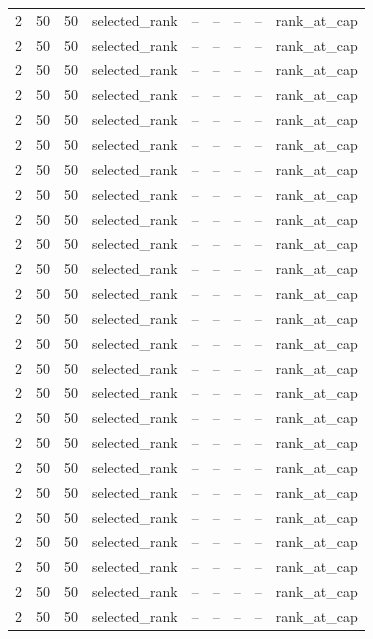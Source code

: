 \begin{longtable}{lllllllll}
2 & 50 & 50 & selected\_rank & -- & -- & -- & -- & rank\_at\_cap \\
2 & 50 & 50 & selected\_rank & -- & -- & -- & -- & rank\_at\_cap \\
2 & 50 & 50 & selected\_rank & -- & -- & -- & -- & rank\_at\_cap \\
2 & 50 & 50 & selected\_rank & -- & -- & -- & -- & rank\_at\_cap \\
2 & 50 & 50 & selected\_rank & -- & -- & -- & -- & rank\_at\_cap \\
2 & 50 & 50 & selected\_rank & -- & -- & -- & -- & rank\_at\_cap \\
2 & 50 & 50 & selected\_rank & -- & -- & -- & -- & rank\_at\_cap \\
2 & 50 & 50 & selected\_rank & -- & -- & -- & -- & rank\_at\_cap \\
2 & 50 & 50 & selected\_rank & -- & -- & -- & -- & rank\_at\_cap \\
2 & 50 & 50 & selected\_rank & -- & -- & -- & -- & rank\_at\_cap \\
2 & 50 & 50 & selected\_rank & -- & -- & -- & -- & rank\_at\_cap \\
2 & 50 & 50 & selected\_rank & -- & -- & -- & -- & rank\_at\_cap \\
2 & 50 & 50 & selected\_rank & -- & -- & -- & -- & rank\_at\_cap \\
2 & 50 & 50 & selected\_rank & -- & -- & -- & -- & rank\_at\_cap \\
2 & 50 & 50 & selected\_rank & -- & -- & -- & -- & rank\_at\_cap \\
2 & 50 & 50 & selected\_rank & -- & -- & -- & -- & rank\_at\_cap \\
2 & 50 & 50 & selected\_rank & -- & -- & -- & -- & rank\_at\_cap \\
2 & 50 & 50 & selected\_rank & -- & -- & -- & -- & rank\_at\_cap \\
2 & 50 & 50 & selected\_rank & -- & -- & -- & -- & rank\_at\_cap \\
2 & 50 & 50 & selected\_rank & -- & -- & -- & -- & rank\_at\_cap \\
2 & 50 & 50 & selected\_rank & -- & -- & -- & -- & rank\_at\_cap \\
2 & 50 & 50 & selected\_rank & -- & -- & -- & -- & rank\_at\_cap \\
2 & 50 & 50 & selected\_rank & -- & -- & -- & -- & rank\_at\_cap \\
2 & 50 & 50 & selected\_rank & -- & -- & -- & -- & rank\_at\_cap \\
2 & 50 & 50 & selected\_rank & -- & -- & -- & -- & rank\_at\_cap \\

\end{longtable}
